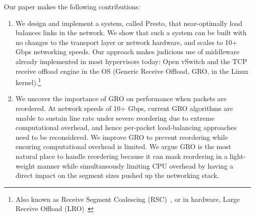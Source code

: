 
Our paper makes the following contributions:
\begin{enumerate}

\item We design and implement a system, called Presto, that near-optimally load balances
links in the network. We show that such a system can be built with no changes to the transport
layer or network hardware, and scales to 10+ Gbps networking speeds.
Our approach makes judicious use of middleware
already implemented in most hypervisors today: Open vSwitch and the TCP receive offload engine in the OS
(Generic Receive Offload, GRO, in the Linux kernel).\footnote{Also known as Receive Segment Coalescing (RSC)~\cite{ms-rsc}, or in hardware, Large Receive Offload (LRO)~\cite{grossman2005large}} 

\item We uncover the importance of GRO on performance when packets are reordered.
At network speeds of 10+ Gbps, current GRO algorithms are unable to sustain line rate under 
severe reordering due to extreme computational overhead, and hence 
per-packet load-balancing approaches~\cite{drb,packetspray} need to be reconsidered. We
improve GRO to prevent reordering while ensuring computational overhead is limited.
We argue
GRO is the most natural place to handle reordering because it can mask
reordering in a light-weight manner while simultaneously limiting CPU overhead by having a direct impact
on the segment sizes pushed up the networking stack.


\end{enumerate}
